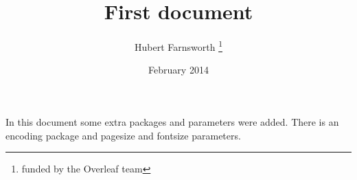 \documentclass[12pt, letterpaper, twoside]{article}
\title{First document}
\author{Hubert Farnsworth \thanks{funded by the Overleaf team}}
\date{February 2014}
\begin{document}
\begin{titlepage}
\maketitle
\end{titlepage}

In this document some extra packages and parameters
were added. There is an encoding package
and pagesize and fontsize parameters.
\end{document}
